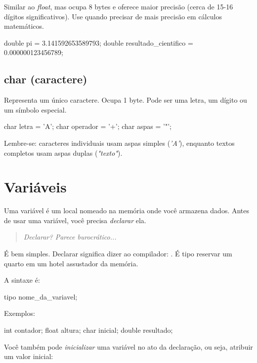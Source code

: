 Similar ao \textit{float}, mas ocupa 8 bytes e oferece maior precisão (cerca de 15-16 dígitos significativos). Use quando precisar de mais precisão em cálculos matemáticos.

\begin{ccode}
  double pi = 3.141592653589793;
  double resultado_cientifico = 0.000000123456789;
\end{ccode}

\subsection{char (caractere)}

Representa um único caractere. Ocupa 1 byte. Pode ser uma letra, um dígito ou um símbolo especial.

\begin{ccode}
  char letra = 'A';
  char operador = '+';
  char aspas = '"';
\end{ccode}

Lembre-se: caracteres individuais usam aspas simples (\textit{'A'}), enquanto textos completos usam aspas duplas (\textit{"texto"}).

\section{Variáveis}

Uma variável é um local nomeado na memória onde você armazena dados. Antes de usar uma variável, você precisa \textit{declarar} ela.

\begin{quote}
\textit{Declarar? Parece burocrático...}
\end{quote}

É bem simples. Declarar significa dizer ao compilador: . É tipo reservar um quarto em um hotel assustador da memória.

A sintaxe é:

\begin{ccode}
  tipo nome_da_variavel;
\end{ccode}

Exemplos:

\begin{ccode}
  int contador;
  float altura;
  char inicial;
  double resultado;
\end{ccode}

Você também pode \textit{inicializar} uma variável no ato da declaração, ou seja, atribuir um valor inicial:

